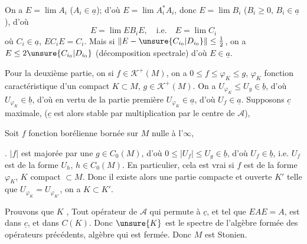 On a $E=\lim A_i$ ($A_i\in\underline a$); d'où $E=\lim A_i^*A_i$, donc $E=\lim B_i$ ($B_i\geq0$, $B_i\in\underline a$), d'où
\[
E=\lim EB_iE,\quad\text{i.e.}\quad E=\lim C_i
\]
où $C_i\in\underline a$, $EC_iE=C_i$.  Mais si $\|E-\unsure{C_{i_0}|D_{i_0}}\|\leq\frac12$, on a $E\leq2\unsure{C_{i_0}|D_{i_0}}$ (décomposition spectrale) d'où $E\in\underline a$.


Pour la deuxième partie, on   si $f\in\mathcal K^+(M)$, on a $0\leq f\leq\varphi_K\leq g$, $\varphi_K$ fonction caractéristique d'un compact $K\subset M$, $g\in\mathcal K^+(M)$. On a $U_{\varphi_K}\leq U_g\in\underline b$, d'où $U_{\varphi_K}\in\underline b$, d'où en vertu de la partie première $U_{\varphi_K}\in\underline a$, d'où $U_f\in\underline a$. Supposons $\underline c$ maximale, ($\underline c$ est alors stable par multiplication par le centre de $\mathcal A$), 

Soit $f$ fonction borélienne bornée sur $M$ nulle à l'$\infty$,  

. $|f|$ est majorée par une $g\in C_0(M)$, d'où $0\leq|U_f|\leq U_g\in\underline b$, d'où $U_f\in\underline b$, i.e. $U_f$ est de la forme $U_h$, $h\in C_0(M)$. En particulier, cela est vrai si $f$ est de la  forme $\varphi_K$, $K$ compact $\subset M$. Donc il existe alors une partie compacte et ouverte $K'$ telle que $U_{\varphi_K}=U_{\varphi_{K'}}$, on a $K\subset K'$.

Prouvons que $K$ ,  Tout opérateur  de $\mathcal A$ qui permute à $\underline c$, et tel que $EAE=A$, est dans $\underline c$, et  dans $C(K)$. Donc $\unsure{K}$ est le spectre de l'algèbre formée des opérateurs précédents, algèbre qui est   fermée. Donc $M$ est Stonien.

